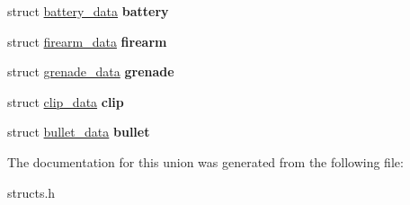 \begin{DoxyCompactItemize}
\item 
\hypertarget{unionobj__info_a309b79c3adbc4e1fa3afa0b53c1a08bb}{struct \hyperlink{structbattery__data}{battery\-\_\-data} {\bfseries battery}}\label{unionobj__info_a309b79c3adbc4e1fa3afa0b53c1a08bb}

\item 
\hypertarget{unionobj__info_a5da8ed829db1d77e1e69aad0bc84e7fc}{struct \hyperlink{structfirearm__data}{firearm\-\_\-data} {\bfseries firearm}}\label{unionobj__info_a5da8ed829db1d77e1e69aad0bc84e7fc}

\item 
\hypertarget{unionobj__info_a4aa6f3fa4d6f8e47c0e5c2f06d3a1822}{struct \hyperlink{structgrenade__data}{grenade\-\_\-data} {\bfseries grenade}}\label{unionobj__info_a4aa6f3fa4d6f8e47c0e5c2f06d3a1822}

\item 
\hypertarget{unionobj__info_acc99009097df8afe28a196266eb1624c}{struct \hyperlink{structclip__data}{clip\-\_\-data} {\bfseries clip}}\label{unionobj__info_acc99009097df8afe28a196266eb1624c}

\item 
\hypertarget{unionobj__info_acf2324b3d090ccafc9bf528a2165cabc}{struct \hyperlink{structbullet__data}{bullet\-\_\-data} {\bfseries bullet}}\label{unionobj__info_acf2324b3d090ccafc9bf528a2165cabc}

\end{DoxyCompactItemize}


The documentation for this union was generated from the following file\-:\begin{DoxyCompactItemize}
\item 
structs.\-h\end{DoxyCompactItemize}
